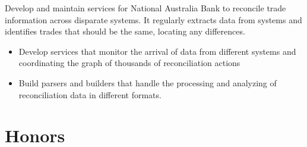 \documentclass{resume}
\begin{document}
\begin{flushleft}
Develop and maintain services for National Australia Bank to reconcile trade information across disparate systems. It regularly extracts data from systems and identifies trades that should be the same, locating any differences.
\begin{itemize}
  \item Develop services that monitor the arrival of data from different systems and coordinating the graph of thousands of reconciliation actions
  \item Build parsers and builders that handle the processing and analyzing of reconciliation data in different formats.
\end{itemize}
\end{flushleft}

\section{Honors}
\end{document}
